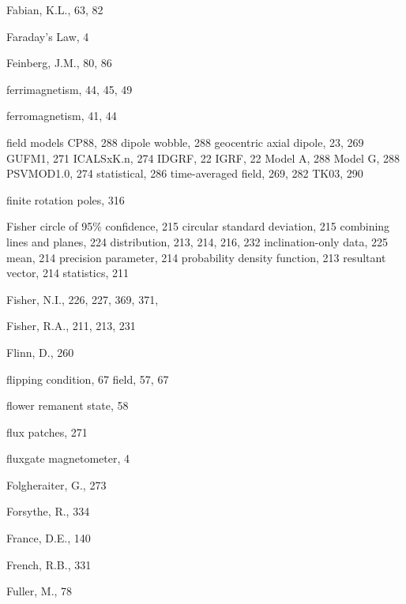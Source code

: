 \documentclass[,plain]{tauxe}
\begin{document}
\begin{theindex}
  \item Fabian, K.L., 63, 82
  \item Faraday's Law, 4
  \item Feinberg, J.M., 80, 86
  \item ferrimagnetism, 44, 45, 49
  \item ferromagnetism, 41, 44
  \item field models
    \subitem CP88, 288
    \subitem dipole wobble, 288
    \subitem geocentric axial dipole, 23, 269
    \subitem GUFM1, 271
    \subitem ICALSxK.n, 274
    \subitem IDGRF, 22
    \subitem IGRF, 22
    \subitem Model A, 288
    \subitem Model G, 288
    \subitem PSVMOD1.0, 274
    \subitem statistical, 286
    \subitem time-averaged field, 269, 282
    \subitem TK03, 290
  \item finite rotation poles, 316
  \item Fisher
    \subitem circle of 95\% confidence, 215
    \subitem circular standard deviation, 215
    \subitem combining lines and planes, 224
    \subitem distribution, 213, 214, 216, 232
    \subitem inclination-only data, 225
    \subitem mean, 214
    \subitem precision parameter, 214
    \subitem probability density function, 213
    \subitem resultant vector, 214
    \subitem statistics, 211
  \item Fisher, N.I., 226, 227, 369, 371,
  \item Fisher, R.A., 211, 213, 231
  \item Flinn, D., 260
  \item flipping
    \subitem condition, 67
    \subitem field, 57, 67
  \item flower remanent state, 58
  \item flux patches, 271
  \item fluxgate magnetometer, 4
  \item Folgheraiter, G., 273
  \item Forsythe, R., 334
  \item France, D.E., 140
  \item French, R.B., 331
  \item Fuller, M., 78

  \indexspace


\end{theindex}
\end{document}
